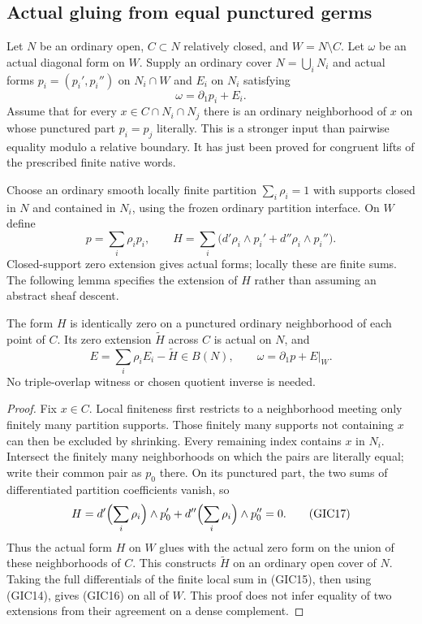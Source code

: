 \subsection{Actual gluing from equal punctured germs}

Let $N$ be an ordinary open, $C\subset N$ relatively closed,
and $W=N\setminus C$.  Let $\omega$ be an actual diagonal
form on $W$.  Supply an ordinary cover $N=\bigcup_iN_i$ and
actual forms $p_i=(p_i',p_i'')$ on $N_i\cap W$ and $E_i$
on $N_i$ satisfying
\[
                          \omega=\partial_1p_i+E_i.
 \tag{GIC14}
\]
Assume that for every $x\in C\cap N_i\cap N_j$ there is
an ordinary neighborhood of $x$ on whose punctured part
$p_i=p_j$ literally.  This is a stronger input than pairwise
equality modulo a relative boundary.  It has just been proved
for congruent lifts of the prescribed finite native words.

Choose an ordinary smooth locally finite partition
$\sum_i\rho_i=1$ with supports closed in $N$ and contained
in $N_i$, using the frozen ordinary partition interface.
On $W$ define
\[
 p=\sum_i\rho_i p_i,\qquad
 H=\sum_i\bigl(d'\rho_i\wedge p_i'
                         +d''\rho_i\wedge p_i''\bigr).
 \tag{GIC15}
\]
Closed-support zero extension gives actual forms; locally these
are finite sums.  The following lemma specifies the extension
of $H$ rather than assuming an abstract sheaf descent.

\begin{lemma}
The form $H$ is identically zero on a punctured ordinary
neighborhood of each point of $C$.  Its zero extension
$\widetilde H$ across $C$ is actual on $N$, and
\[
        E=\sum_i\rho_iE_i-\widetilde H\in B(N),\qquad
                        \omega=\partial_1p+E|_W.
 \tag{GIC16}
\]
No triple-overlap witness or chosen quotient inverse is needed.
\end{lemma}

\begin{proof}
Fix $x\in C$.  Local finiteness first restricts to a neighborhood
meeting only finitely many partition supports.  Those finitely
many supports not containing $x$ can then be excluded by
shrinking.  Every remaining index contains $x$ in $N_i$.
Intersect the finitely many neighborhoods on which the pairs
are literally equal; write their common pair as $p_0$ there.
On its punctured part, the two sums of differentiated partition
coefficients vanish, so
\[
               H=d'\Bigl(\sum_i\rho_i\Bigr)\wedge p_0'
                   +d''\Bigl(\sum_i\rho_i\Bigr)\wedge p_0''=0.
 \tag{GIC17}
\]
Thus the actual form $H$ on $W$ glues with the actual zero
form on the union of these neighborhoods of $C$.  This
constructs $\widetilde H$ on an ordinary open cover of $N$.
Taking the full differentials of the finite local sum in
(GIC15), then using (GIC14), gives (GIC16) on all of $W$.
This proof does not infer equality of two extensions from
their agreement on a dense complement.
\end{proof}

